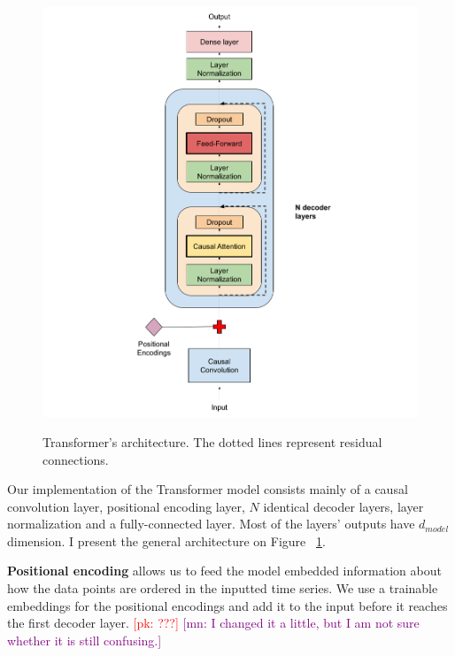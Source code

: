 \documentclass[en]{pracamgr}
\newcommand{\pk}[1]{\textcolor{red}{\small [pk: #1]}}
\newcommand{\mn}[1]{\textcolor{purple}{\small [mn: #1]}}
\begin{document}
\begin{figure}[ht!]
	\centering
	\includegraphics[height=130mm]{decoder3.png}
	\caption{Transformer's architecture. The dotted lines represent residual connections. \label{our-decoder}}
\end{figure}


Our implementation of the Transformer model consists mainly of a causal convolution layer, positional encoding layer, $N$ identical decoder layers, layer normalization and a fully-connected layer. 
Most of the layers' outputs have $d_{model}$ dimension.
I present the general architecture on Figure ~\ref{our-decoder}.

\textbf{Positional encoding} allows us to feed the model embedded information about how the data points are ordered in the inputted time series.
We use a trainable embeddings for the positional encodings and add it to the input before it reaches the first decoder layer. \pk{???} \mn{I changed it a little, but I am not sure whether it is still confusing.}
\end{document}
